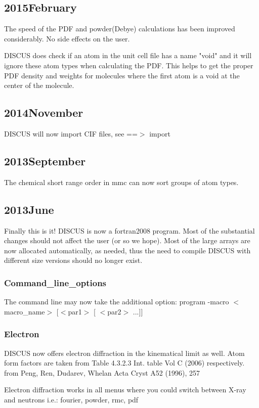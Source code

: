 \subsection*{2015February}
\par
The speed of the PDF and powder(Debye) calculations has been improved 
considerably. No side effects on the user. 
\par
DISCUS does check if an atom in the unit cell file has a name "void" 
and it will ignore these atom types when calculating the PDF. 
This helps to get the proper PDF density and weights for molecules 
where the first atom is a void at the center of the molecule. 
\subsection*{2014November}
\par
DISCUS will now import CIF files, see ==$> $ import 
\par
\subsection*{2013September}
\par
The chemical short range order in mmc can now sort groups of 
atom types. 
\par
\subsection*{2013June}
\par
Finally this is it! DISCUS is now a fortran2008 program. Most of the 
substantial changes should not affect the user (or so we hope). 
Most of the large arrays are now allocated automatically, as needed, 
thus the need to compile DISCUS with different size versions should 
no longer exist. 
\par
\subsubsection{Command\_line\_options}
\par
The command line may now take the additional option: 
program -macro $ <$macro\_name$> $ [$ <$par1$> $ [ $ <$par2$> $ ...]] 
\subsubsection{Electron}
\par
DISCUS now offers electron diffraction in the kinematical limit as well. 
Atom form factors are taken from Table 4.3.2.3 Int. table Vol C (2006) 
respectively. from Peng, Ren, Dudarev, Whelan Acta Cryst A52 (1996), 257 
\par
Electron diffraction works in all menus where you could switch between 
X-ray and neutrons i.e.: fourier, powder, rmc, pdf 
